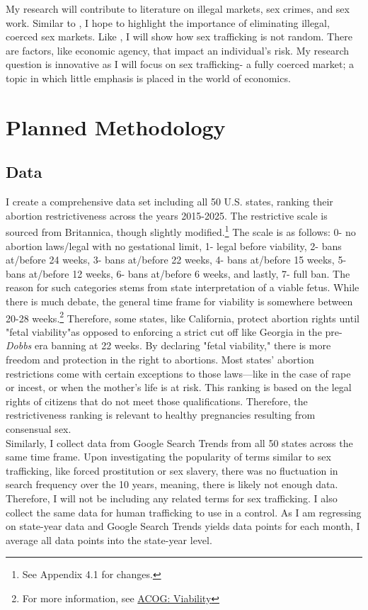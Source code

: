 \documentclass[12pt]{article}
\begin{document}
\indent My research will contribute to literature on illegal markets, sex crimes, and sex work.  Similar to \cite{leeandpersson}, I hope to highlight the importance of eliminating illegal, coerced sex markets. Like \cite{omar}, I will show how sex trafficking is not random. There are factors, like economic agency, that impact an individual’s risk. My research question is innovative as I will focus on sex trafficking- a fully coerced market; a topic in which little emphasis is placed in the world of economics.
\section{Planned Methodology}
\subsection{Data}
\indent I create a comprehensive data set including all 50 U.S. states, ranking their abortion restrictiveness  across the years 2015-2025. The restrictive scale is sourced from Britannica, though slightly modified.\footnote{See Appendix 4.1 for changes.} The scale is as follows: 0- no abortion laws/legal with no gestational limit, 1- legal before viability, 2- bans at/before 24 weeks, 3- bans at/before 22 weeks, 4- bans at/before 15 weeks, 5- bans at/before 12 weeks, 6- bans at/before 6 weeks, and lastly, 7- full ban. The reason for such categories stems from state interpretation of a viable fetus. While there is much debate, the general time frame for viability is somewhere between 20-28 weeks.\footnote{For more information, see \href{https://www.acog.org/advocacy/facts-are-important/understanding-and-navigating-viability}{ACOG: Viability}} Therefore, some states, like California, protect abortion rights until "fetal viability"as opposed to enforcing a strict cut off like Georgia in the pre-\textit{Dobbs} era banning at 22 weeks. By declaring "fetal viability," there is more freedom and protection in the right to abortions. Most states' abortion restrictions come with certain exceptions to those laws—like in the case of rape or incest, or when the mother's life is at risk. This ranking is based on the legal rights of citizens that do not meet those qualifications. Therefore, the restrictiveness ranking is relevant to healthy pregnancies resulting from consensual sex.  \\
\indent Similarly, I collect data from Google Search Trends from all 50 states across the same time frame. Upon investigating the popularity of terms similar to sex trafficking, like forced prostitution or sex slavery, there was no fluctuation in search frequency over the 10 years, meaning, there is likely not enough data. Therefore, I will not be including any related terms for sex trafficking. I also collect the same data for human trafficking to use in a control. As I am regressing on state-year data and Google Search Trends yields data points for each month, I average all data points into the state-year level. \\
\end{document}
